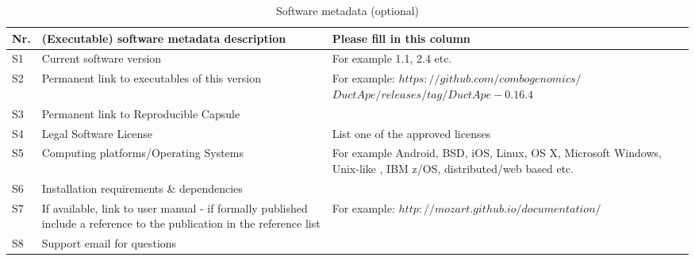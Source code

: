 \documentclass[preprint,12pt,letterpaper]{elsarticle}
\begin{document}
\begin{table}[!h]
\begin{tabular}{|l|p{6.5cm}|p{6.5cm}|}
\hline
\textbf{Nr.} & \textbf{(Executable) software metadata description} & \textbf{Please fill in this column} \\
\hline
S1 & Current software version & For example 1.1, 2.4 etc. \\
\hline
S2 & Permanent link to executables of this version  & For example: $https://github.com/combogenomics/$ $DuctApe/releases/tag/DuctApe-0.16.4$ \\
\hline
S3  & Permanent link to Reproducible Capsule & \\
\hline
S4 & Legal Software License & List one of the approved licenses \\
\hline
S5 & Computing platforms/Operating Systems & For example Android, BSD, iOS, Linux, OS X, Microsoft Windows, Unix-like , IBM z/OS, distributed/web based etc. \\
\hline
S6 & Installation requirements \& dependencies & \\
\hline
S7 & If available, link to user manual - if formally published include a reference to the publication in the reference list & For example: $http://mozart.github.io/documentation/$ \\
\hline
S8 & Support email for questions & \\
\hline
\end{tabular}
\caption{Software metadata (optional)}
\label{} 
\end{table}
\end{document}
